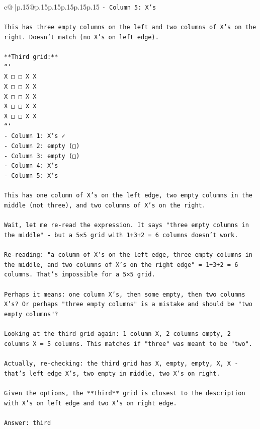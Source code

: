 \documentclass{article}
\begin{document}
{\begin{supertabular}{c@{$\;$}|p{.15\linewidth}@{}p{.15\linewidth}p{.15\linewidth}p{.15\linewidth}p{.15\linewidth}p{.15\linewidth}}
{{{\texttt{{-} Column 5: X's} \\
\\ 
\texttt{This has three empty columns on the left and two columns of X's on the right. Doesn't match (no X's on left edge).} \\
\\ 
\texttt{**Third grid:**} \\
\texttt{```} \\
\texttt{X □ □ X X} \\
\texttt{X □ □ X X} \\
\texttt{X □ □ X X} \\
\texttt{X □ □ X X} \\
\texttt{X □ □ X X} \\
\texttt{```} \\
\texttt{{-} Column 1: X's ✓} \\
\texttt{{-} Column 2: empty (□)} \\
\texttt{{-} Column 3: empty (□)} \\
\texttt{{-} Column 4: X's} \\
\texttt{{-} Column 5: X's} \\
\\ 
\texttt{This has one column of X's on the left edge, two empty columns in the middle (not three), and two columns of X's on the right.} \\
\\ 
\texttt{Wait, let me re{-}read the expression. It says "three empty columns in the middle" {-} but a 5×5 grid with 1+3+2 = 6 columns doesn't work. } \\
\\ 
\texttt{Re{-}reading: "a column of X's on the left edge, three empty columns in the middle, and two columns of X's on the right edge" = 1+3+2 = 6 columns. That's impossible for a 5×5 grid.} \\
\\ 
\texttt{Perhaps it means: one column X's, then some empty, then two columns X's? Or perhaps "three empty columns" is a mistake and should be "two empty columns"?} \\
\\ 
\texttt{Looking at the third grid again: 1 column X, 2 columns empty, 2 columns X = 5 columns. This matches if "three" was meant to be "two".} \\
\\ 
\texttt{Actually, re{-}checking: the third grid has X, empty, empty, X, X {-} that's left edge X's, two empty in middle, two X's on right.} \\
\\ 
\texttt{Given the options, the **third** grid is closest to the description with X's on left edge and two X's on right edge.} \\
\\ 
\texttt{Answer: third} \\
            }
        }
    }
     \\ \\


\end{supertabular}}
\end{document}
